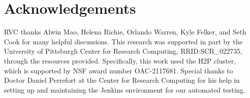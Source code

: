 \section{Acknowledgements}

RVC thanks Alwin Mao, Helena Richie, Orlando Warren, Kyle Felker, and Seth Cook for many helpful discussions. This research was supported in part by the University of Pittsburgh Center for Research Computing, RRID:SCR\_022735, through the resources provided. Specifically, this work used the H2P cluster, which is supported by NSF award number OAC-2117681. Special thanks to Doctor Daniel Perrefort at the Center for Research Computing for his help in setting up and maintaining the Jenkins environment for our automated testing.

